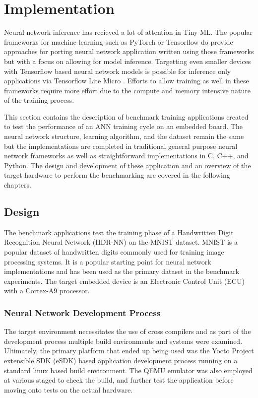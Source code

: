 \part{Implementation}

Neural network inference has recieved a lot of attention in Tiny ML. The popular frameworks for machine learning such as PyTorch or Tensorflow do provide approaches for porting neural network application written using those frameworks but with a focus on allowing for model inference. Targetting even smaller devices with Tensorflow based neural network models is possible for inference only applications via Tensorflow Lite Micro \cite{tflm}. Efforts to allow training as well in these frameworks require more effort due to the compute and memory intensive nature of the training process.

This section contains the description of benchmark training applications created to test the performance of an ANN training cycle on an embedded board. The neural network structure, learning algorithm, and the dataset remain the same but the implementations are completed in traditional general purpose neural network frameworks as well as straightforward implementations in C, C++, and Python. The design and development of these application and an overview of the target hardware to perform the benchmarking are covered in the following chapters.

\chapter{Design}

The benchmark applications test the training phase of a Handwritten Digit Recognition Neural Network (HDR-NN) on the MNIST \cite{mnist} dataset. MNIST is a popular dataset of handwritten digits commonly used for training image processing systems. It is a popular starting point for neural network implementations and has been used as the primary dataset in the benchmark experiments. The target embedded device is an Electronic Control Unit (ECU) with a Cortex-A9 processor.

\section{Neural Network Development Process}

The target environment necessitates the use of cross compilers and as part of the development process multiple build environments and systems were examined. Ultimately, the primary platform that ended up being used was the Yocto Project extensible SDK (eSDK) based application development process running on a standard linux based build environment. The QEMU emulator was also employed at various staged to check the build, and further test the application before moving onto tests on the actual hardware.

